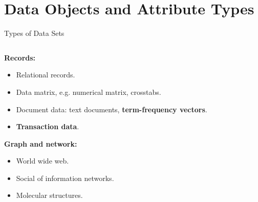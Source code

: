 \section{Data Objects and Attribute Types}

\begin{frame}{Types of Data Sets}
	\begin{columns}
		\begin{column}{0.45\textwidth}
			\textbf{Records:}
			\begin{itemize}[noitemsep]
				\item Relational records.
				\item Data matrix, e.g. numerical matrix, crosstabs.
				\item Document data: text documents, \textbf{term-frequency vectors}. 
				\item \textbf{Transaction data}. 
			\end{itemize}
			\textbf{Graph and network:}
			\begin{itemize}[noitemsep]
				\item World wide web.
				\item Social of information networks.
				\item Molecular structures.
			\end{itemize}
		\end{column}


\end{columns}
\end{frame}
